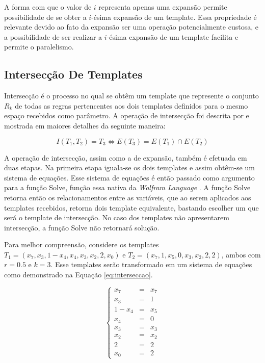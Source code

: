 	A forma com que o valor de $i$ representa apenas uma expansão permite possibilidade de se obter a $i$-ésima expansão de um template. Essa propriedade é relevante devido ao fato da expansão ser uma operação potencialmente custosa, e a possibilidade de ser realizar a $i$-ésima expansão de um template facilita e permite o paralelismo.

\newpage\newpage
\subsection{Intersecção De Templates}%
	Intersecção é o processo no qual se obtêm um template que represente o conjunto $R_k$ de todas as regras pertencentes aos dois templates definidos para o mesmo espaço recebidos como parâmetro. A operação de intersecção foi descrita por  e mostrada em maiores detalhes da seguinte maneira:

	\begin{equation}
	I(T_1,T_2)=T_3 \Leftrightarrow E(T_3) = E(T_1) \cap E(T_2)
	\end{equation}

	A operação de intersecção, assim como a de expansão, também é efetuada em duas etapas. Na primeira etapa iguala-se os dois templates e assim obtêm-se um sistema de equações. Esse sistema de equações é então passado como argumento para a função Solve, função essa nativa da \textit{Wolfram Language} \cite{woframMathematica10}. A função Solve retorna então os relacionamentos entre as variáveis, que ao serem aplicados aos templates recebidos, retorna dois template equivalente, bastando escolher um que será o template de intersecção. No caso dos templates não apresentarem intersecção, a função Solve não retornará solução.

	Para melhor compreensão, considere os templates $T_1 = (x_7,x_3,1-x_4,x_4,x_3,x_2,2,x_0)$ e $T_2 = (x_7,1,x_5,0,x_3,x_2,2,2)$, ambos com $r=0.5$ e $k=3$. Esse templates serão transformado em um sistema de equações como demonstrado na Equação \ref{eq:interseccao}.

	\begin{equation}
	\left\{\begin{matrix}
	x_7   & = & x_7 \\ 
	x_3   & = & 1 \\ 
	1-x_4 & = & x_5    \\ 
	x_4   & = & 0    \\ 
	x_3   & = & x_3    \\ 
	x_2   & = & x_2   \\ 
	2     & = & 2   \\ 
	x_0   & = & 2
	\end{matrix}\right.
	\label{eq:interseccao}
	\end{equation}

